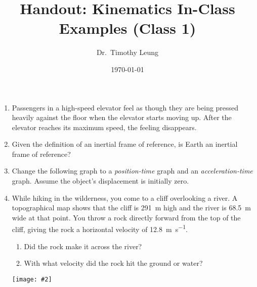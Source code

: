 \documentclass{../../oss-handout}
\title{Handout: Kinematics In-Class Examples (Class 1)}
\author{Dr.\ Timothy Leung}
\date{\today}
\newcommand{\pic}[2]{\texttt{[image: \#2]}}
\begin{document}
\thispagestyle{title}
\gentitle

\begin{enumerate}
\item Passengers in a high-speed elevator feel as though they are being pressed
  heavily against the floor when the elevator starts moving up. After the
  elevator reaches its maximum speed, the feeling disappears.

\item Given the definition of an inertial frame of reference,
  is Earth an inertial frame of reference?
  
\item Change the following graph to a \emph{position-time}
  graph and an \emph{acceleration-time} graph. Assume the object's displacement
  is initially zero.
  \begin{center}
  \end{center}
  \newpage
  
\item While hiking in the wilderness, you come to a cliff overlooking a river.
  A topographical map shows that the cliff is \SI{291}{\metre} high and the
  river is \SI{68.5}{\metre} wide at that point. You throw a rock directly
  forward from the top of the cliff, giving the rock a horizontal velocity of
  \SI{12.8}{\metre\per\second}.
  \begin{enumerate}[noitemsep,topsep=0pt]
  \item Did the rock make it across the river?
  \item With what velocity did the rock hit the ground or water?
  \end{enumerate}
  \pic{.3}{../graphics/cliff.png}
    

\end{enumerate}
\end{document}

